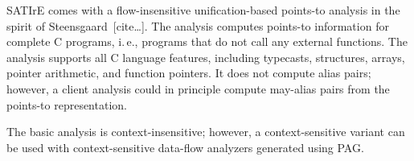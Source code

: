 \documentclass[a4paper,12pt]{report}
\begin{document}
%
%


SATIrE comes with a flow-insensitive unification-based points-to analysis in
the spirit of Steensgaard~[cite\dots]. The analysis computes points-to
information for complete C programs, i.\,e., programs that do not call any
external functions. The analysis supports all C language features, including
typecasts, structures, arrays, pointer arithmetic, and function pointers. It
does not compute alias pairs; however, a client analysis could in principle
compute may-alias pairs from the points-to representation.

The basic analysis is context-insensitive; however, a context-sensitive
variant can be used with context-sensitive data-flow analyzers generated
using PAG.
\end{document}
